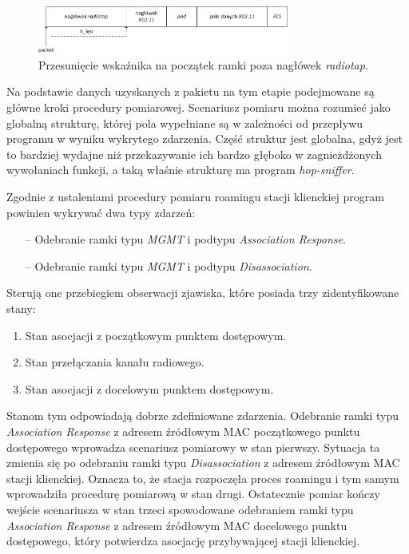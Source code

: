 \begin{figure}[htb]
\begin{center}
\includegraphics[width=312px]{img/RadiotapWifi}
\caption{Przesunięcie wskaźnika na początek ramki poza nagłówek \emph{radiotap}.}
\label{RadiotapWifi}
\end{center}
\end{figure}

Na podstawie danych uzyskanych z pakietu na tym etapie podejmowane są główne kroki procedury pomiarowej. Scenariusz pomiaru można rozumieć jako globalną strukturę, której pola wypełniane są w zależności od przepływu programu w wyniku wykrytego zdarzenia. Część struktur jest globalna, gdyż jest to bardziej wydajne niż przekazywanie ich bardzo głęboko w zagnieżdżonych wywołaniach funkcji, a taką właśnie strukturę ma program \emph{hop-sniffer}. 

Zgodnie z ustaleniami procedury pomiaru roamingu stacji klienckiej program powinien wykrywać dwa typy zdarzeń:
\begin{itemize}
\item[--] Odebranie ramki typu \emph{MGMT} i podtypu \emph{Association Response}.
\item[--] Odebranie ramki typu \emph{MGMT} i podtypu \emph{Disassociation}.
\end{itemize}
Sterują one przebiegiem obserwacji zjawiska, które posiada trzy zidentyfikowane stany:
\begin{enumerate}
\item Stan asocjacji z początkowym punktem dostępowym.
\item Stan przełączania kanału radiowego.
\item Stan asocjacji z docelowym punktem dostępowym.
\end{enumerate}
Stanom tym odpowiadają dobrze zdefiniowane zdarzenia. Odebranie ramki typu \emph{Association Response} z adresem źródłowym MAC początkowego punktu dostępowego wprowadza scenariusz pomiarowy w stan pierwszy. Sytuacja ta zmienia się po odebraniu ramki typu \emph{Disassociation} z adresem źródłowym MAC stacji klienckiej. Oznacza to, że stacja rozpoczęła proces roamingu i tym samym wprowadziła procedurę pomiarową w stan drugi. Ostatecznie pomiar kończy wejście scenariusza w stan trzeci spowodowane odebraniem ramki typu \emph{Association Response} z adresem źródłowym MAC docelowego punktu dostępowego, który potwierdza asocjację przybywającej stacji klienckiej.

